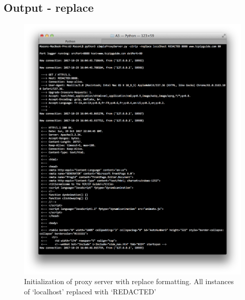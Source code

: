 \documentclass[11pt]{article}
\begin{document}
	\subsection{Output - replace}
	\begin{figure}[H]
	\includegraphics[scale=0.5, trim={0cm 0cm 0cm 0cm}, clip]{replace_output}
	\caption{Initialization of proxy server with replace formatting. All instances of `localhost' replaced with `REDACTED'}
	\end{figure}
\end{document}
